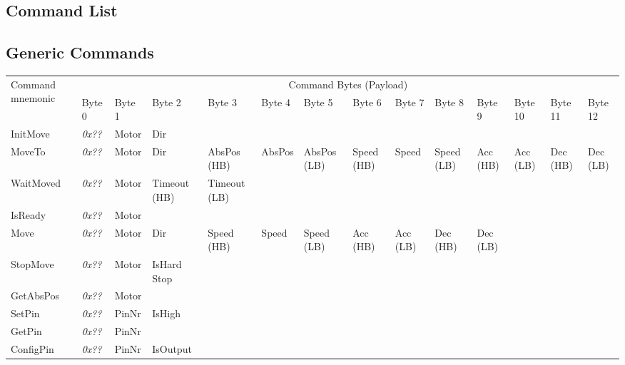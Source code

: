 \documentclass[10pt,a4paper]{article}
\newcommand{\IMV}{0x??}
\newcommand{\MTO}{0x??}
\newcommand{\WTM}{0x??}
\newcommand{\IRD}{0x??}
\newcommand{\MOV}{0x??}
\newcommand{\SPM}{0x??}
\newcommand{\GAP}{0x??}
\newcommand{\STP}{0x??}
\newcommand{\GTP}{0x??}
\newcommand{\CNP}{0x??}
\begin{document}
\begin{landscape}
\section{Command List}
\subsection{Generic Commands}
\begin{tabular}{|p{1.8cm}|p{1cm}|p{1cm}|p{1.3cm}|p{1.2cm}|p{1cm}|p{1cm}|p{1cm}|p{1cm}|p{1cm}|p{1cm}|p{1.2cm}|p{1.2cm}|p{1.2cm}|}
	\hline
	\multirow{2}{2cm}{Command mnemonic} & \multicolumn{13}{c|}{Command Bytes (Payload)} \\\cline{2-14} 
		&  Byte 0 & Byte 1 & Byte 2 & Byte 3 & Byte 4 & Byte 5 & Byte 6 & Byte 7 & Byte 8 & Byte 9 & Byte 10 & Byte 11 & Byte 12 \\ \hline
	InitMove	& \textit{\IMV}	& Motor	& Dir & & & & & & & & & & \\\hline
	MoveTo		& \textit{\MTO}	& Motor	& Dir & AbsPos (HB) & AbsPos & AbsPos (LB) & Speed (HB) & Speed & Speed (LB) & 
		Acc (HB) & Acc (LB) & Dec (HB) & Dec (LB) \\\hline
	WaitMoved	& \textit{\WTM}	& Motor	& Timeout (HB) & Timeout (LB)& & & & & & & & & \\\hline
	IsReady	& \textit{\IRD}	& Motor	& & & & & & & & & & & \\\hline
	Move	& \textit{\MOV}	& Motor	& Dir & Speed (HB) & Speed & Speed (LB) & Acc (HB) & Acc (LB) & Dec (HB) & Dec (LB) & & & \\\hline
	StopMove & \textit{\SPM}& Motor	& IsHard Stop & & & & & & & & & & \\\hline
	GetAbsPos& \textit{\GAP}& Motor	& & & & & & & & & & & \\\hline
	SetPin	& \textit{\STP}	& PinNr	& IsHigh & & & & & & & & & & \\\hline
	GetPin	& \textit{\GTP}	& PinNr	& & & & & & & & & & & \\\hline
	ConfigPin& \textit{\CNP}& PinNr	& IsOutput & & & & & & & & & & \\\hline	
\end{tabular}


\end{landscape}
\end{document}
